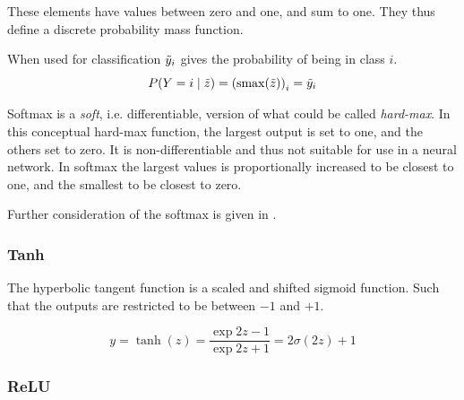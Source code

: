 \documentclass[12pt,parskip]{komatufte}
\begin{document}
These elements have  values between zero and one, and sum to one.
They thus define a discrete probability mass function.

When used for classification $\tilde{y}_i$ gives the probability of being in class $i$.
\begin{equation}
P(Y=i\mid \v z) = \i {\left(\softmax(\v z)\right)}_i  = \iv y_i
\end{equation}


Softmax is a \emph{soft}, i.e. differentiable,  version of what could be called \emph{hard-max}.
In this conceptual hard-max function, the largest output is set to one, and the others set to zero.
It is non-differentiable and thus not suitable for use in a neural network.
In softmax the largest values is proportionally increased to be closest to one,
and the smallest to be closest to zero.

Further consideration of the softmax is given in .

\subsubsection{Tanh}

The hyperbolic tangent function is a  scaled and shifted sigmoid function.
Such that the outputs are restricted to be between $-1$ and $+1$.

\begin{equation}
y=\tanh(z)=\frac{\exp{2z}-1}{\exp{2z}+1}=2\sigma(2z)+1
\end{equation}


\subsubsection{ReLU}
\end{document}
